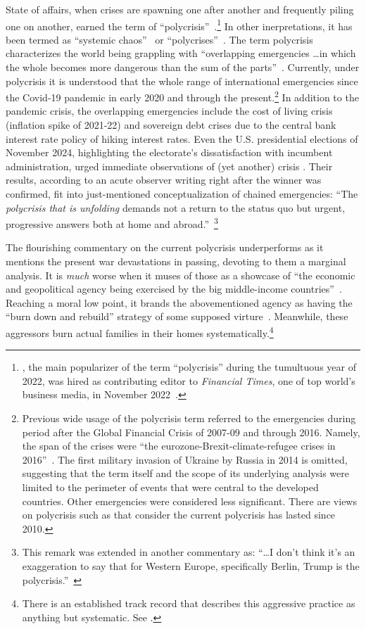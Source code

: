 State of affairs, when crises are spawning one after another and frequently piling one on another, earned the term of ``polycrisis''~\citep{tooze2022}.\footnote{\citeauthor{tooze2022}, the main popularizer of the term ``polycrisis'' during the tumultuous year of 2022, was hired as contributing editor to \textit{Financial Times}, one of top world's business media, in November 2022~\citep{ft2022a}.} In other inerpretations, it has been termed as ``systemic chaos''~\citep{galanis2024} or ``polycrises''~\citep{dymski2024}. The term polycrisis characterizes the world being grappling with ``overlapping emergencies \dots in which the whole becomes more dangerous than the sum of the parts''~\citep{mckenzie2022}. Currently, under polycrisis it is understood that the whole range of international emergencies since the Covid-19 pandemic in early 2020 and through the present.\footnote{Previous wide usage of the polycrisis term referred to the emergencies during period after the Global Financial Crisis of 2007-09 and through 2016. Namely, the span of the crises were ``the eurozone-Brexit-climate-refugee crises in 2016''~\citep{mckenzie2022}. The first military invasion of Ukraine by Russia in 2014 is omitted, suggesting that the term itself and the scope of its underlying analysis were limited to the perimeter of events that were central to the developed countries. Other emergencies were considered less significant. There are views on polycrisis such as \citep{ft2023,delong2024} that consider the current polycrisis has lasted since 2010.} In addition to the pandemic crisis, the overlapping emergencies include the cost of living crisis (inflation spike of 2021-22) and sovereign debt crises due to the central bank interest rate policy of hiking interest rates. Even the U.S. presidential elections of November 2024, highlighting the electorate's dissatisfaction with incumbent administration, urged immediate observations of (yet another) crisis \citep{mead2024}. Their results, according to an acute observer writing right after the winner was confirmed, fit into just-mentioned conceptualization of chained emergencies: ``The \textit{polycrisis that is unfolding} demands not a return to the status quo but urgent, progressive answers both at home and abroad.''~\citep[emphasis added]{tooze2024}\footnote{This remark was extended in another commentary as: ``\dots I don't think it's an exaggeration to say that for Western Europe, specifically Berlin, Trump is the polycrisis.''~\citep{tooze2024b}} 

The flourishing commentary on the current polycrisis underperforms as it mentions the present war devastations in passing, devoting to them a marginal analysis. It is \textit{much} worse when it muses of those as a showcase of ``the economic and geopolitical agency being exercised by the big middle-income countries''~\citep{mckenzie2022}. Reaching a moral low point, it brands the abovementioned agency as having the ``burn down and rebuild'' strategy of some supposed virture~\citep{sahay2024,sahay2024a}. Meanwhile, these aggressors burn actual families in their homes systematically.\footnote{There is an established track record that describes this aggressive practice as anything but systematic. See \citep{nypost2023,ap2024,cnn2024}.}

